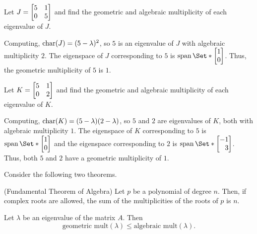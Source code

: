 \begin{example}
	Let $J=\mat{5&1\\0&5}$ and find the geometric and algebraic multiplicity of each eigenvalue of $J$.
	
	Computing, $\operatorname{char}(J)=(5-\lambda)^2$, so $5$ is an eigenvalue of $J$ with algebraic multiplicity $2$.
	The eigenspace of $J$ corresponding to $5$ is $\Span\Set*{\mat{1\\0}}$. Thus, the geometric 
	multiplicity of $5$ is $1$.
\end{example}

\begin{example}
	Let $K=\mat{5&1\\0&2}$ and find the geometric and algebraic multiplicity of each eigenvalue of $K$.
	
	Computing, $\operatorname{char}(K)=(5-\lambda)(2-\lambda)$, so $5$ and $2$ are eigenvalues of $K$, both with algebraic multiplicity $1$.
	The eigenspace of $K$ corresponding to $5$ is $\Span\Set*{\mat{1\\0}}$ and the eigenspace
	corresponding to $2$ is $\Span\Set*{\mat{-1\\3}}$. Thus, both $5$ and $2$ have a geometric
	multiplicity of $1$.
\end{example}


Consider the following two theorems.

\begin{theorem}(Fundamental Theorem of Algebra)
	Let $p$ be a polynomial of degree $n$. Then, if complex roots are allowed,
	the sum of the multiplicities of the roots of $p$ is $n$.
\end{theorem}

\begin{theorem}
	Let $\lambda$ be an eigenvalue of the matrix $A$. Then
	\[
		\text{geometric mult}(\lambda)\leq \text{algebraic mult}(\lambda).
	\]
\end{theorem}

